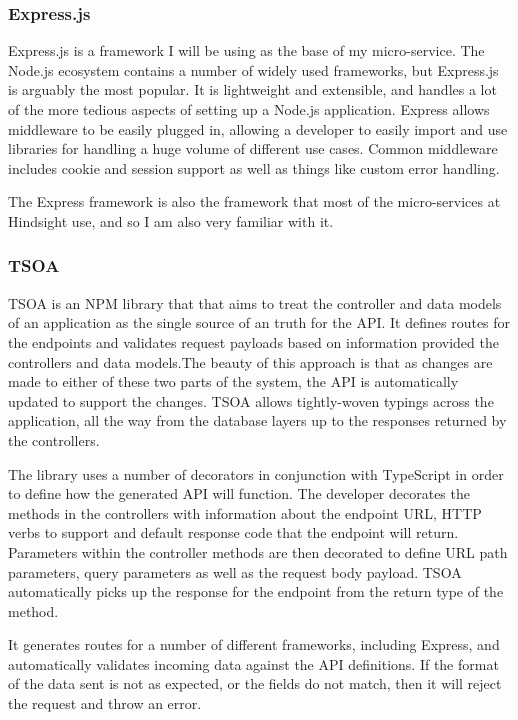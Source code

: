 \subsubsection{Express.js}
Express.js is a framework I will be using as the base of my micro-service. The Node.js ecosystem contains a number of widely used frameworks, but Express.js is arguably the most popular. It is lightweight and extensible, and handles a lot of the more tedious aspects of setting up a Node.js application. Express allows middleware to be easily plugged in, allowing a developer to easily import and use libraries for handling a huge volume of different use cases. Common middleware includes cookie and session support as well as things like custom error handling.

The Express framework is also the framework that most of the micro-services at Hindsight use, and so I am also very familiar with it.
\subsubsection{TSOA}
TSOA is an NPM library that that aims to treat the controller and data models of an application as the single source of an truth for the API. It defines routes for the endpoints and validates request payloads based on information provided the controllers and data models.The beauty of this approach is that as changes are made to either of these two parts of the system, the API is automatically updated to support the changes. TSOA allows tightly-woven typings across the application, all the way from the database layers up to the responses returned by the controllers.

The library uses a number of decorators in conjunction with TypeScript in order to define how the generated API will function. The developer decorates the methods in the controllers with information about the endpoint URL, HTTP verbs to support and default response code that the endpoint will return. Parameters within the controller methods are then decorated to define URL path parameters, query parameters as well as the request body payload. TSOA automatically picks up the response for the endpoint from the return type of the method. 

It generates routes for a number of different frameworks, including Express, and automatically validates incoming data against the API definitions. If the format of the data sent is not as expected, or the fields do not match, then it will reject the request and throw an error.

